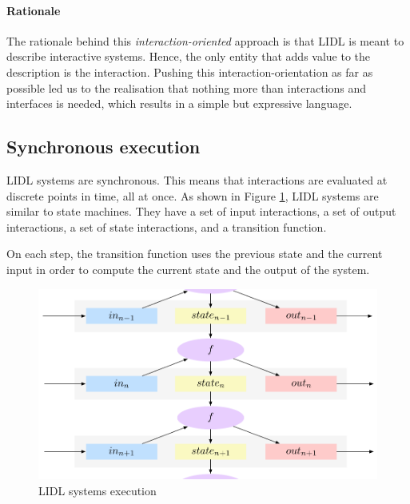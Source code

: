 \documentclass[10pt]{sigplanconf}
\begin{document}
\paragraph{Rationale}

The rationale behind this \emph{interaction-oriented} approach is that LIDL is meant to describe interactive systems. Hence, the only entity that adds value to the description is the interaction. Pushing this interaction-orientation as far as possible led us to the realisation that nothing more than interactions and interfaces is needed, which results in a simple but expressive language.




\subsection{Synchronous execution}

LIDL systems are synchronous. This means that interactions are evaluated at discrete points in time, all at once. As shown in Figure \ref{fig:synchronous}, LIDL systems are similar to state machines. They have a set of input interactions, a set of output interactions, a set of state interactions, and a transition function.

On each step, the transition function uses the previous state and the current input in order to compute the current state and the output of the system.

\begin{figure}[h]
\centering
\includegraphics[width=\linewidth,height=\linewidth,keepaspectratio]{figures/synchronous.pdf}
\caption{LIDL systems execution} 
\label{fig:synchronous}
\end{figure}
\end{document}
